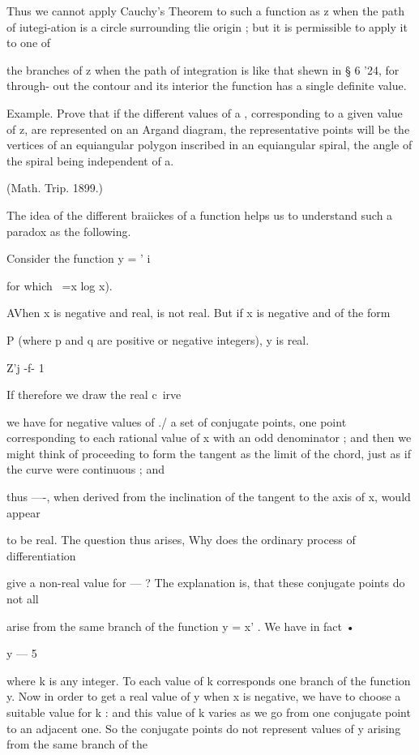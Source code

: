 {{{{Thus we cannot apply Cauchy's Theorem to such a function as z  when the path of 
iutegi-ation is a circle surrounding tlie origin ; but it is permissible to apply it to one of 

the branches of z  when the path of integration is like that shewn in § 6 '24, for through- 
out the contour and its interior the function has a single definite value. 

Example. Prove that if the different values of a , corresponding to a given value of z, 
are represented on an Argand diagram, the representative points will be the vertices of an 
equiangular polygon inscribed in an equiangular spiral, the angle of the spiral being 
independent of a. 

(Math. Trip. 1899.) 

The idea of the different braiickes of a function helps us to understand such a paradox 
as the following. 

Consider the function y = ' i 

for which ~=x     log x). 

AVhen x is negative and real,   is not real. But if x is negative and of the form 

P 
  (where p and q are positive or negative integers), y is real. 

Z'j  -f- 1 

If therefore we draw the real c\ irve 

we have for negative values of ./  a set of conjugate points, one point corresponding to each 
rational value of x with an odd denominator ; and then we might think of proceeding to 
form the tangent as the limit of the chord, just as if the curve were continuous ; and 

thus —-, when derived from the inclination of the tangent to the axis of x, would appear 

to be real. The question thus arises, Why does the ordinary process of differentiation 

give a non-real value for  — ? The explanation is, that these conjugate points do not all 

arise from the same branch of the function y = x' . We have in fact • 

y —   5 

where k is any integer. To each value of k corresponds one branch of the function y. 
Now in order to get a real value of y when x is negative, we have to choose a suitable 
value for k : and this value of k varies as we go from one conjugate point to an adjacent one. 
So the conjugate points do not represent values of y arising from the same branch of the 

}}}}
